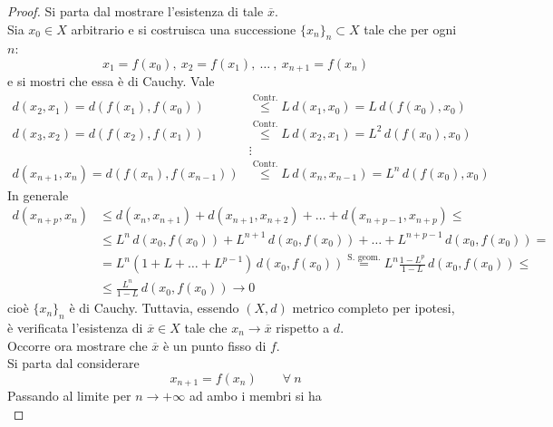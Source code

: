 \begin{proof}
    Si parta dal mostrare l'esistenza di tale $\overline{x}$.\\
    Sia $x_0 \in X$ arbitrario e si costruisca una successione $\{x_n\}_n \subset X$ tale che per ogni $n$:
    \begin{equation*}
            x_1=f(x_0),\ x_2=f(x_1),\ \dots\ ,\ x_{n+1}=f(x_n)
    \end{equation*}
    e si mostri che essa è di Cauchy. Vale
    \begin{equation*}
    \begin{aligned}
        d(x_2, x_1)=d(f(x_1), f(x_0)) &\overset{\text{Contr.}}{\leq} L\, d(x_1, x_0) = L\, d(f(x_0), x_0)\\
        d(x_3, x_2)=d(f(x_2), f(x_1)) &\overset{\text{Contr.}}{\leq} L\, d(x_2, x_1) = L^2\,d(f(x_0), x_0)\\
        &\vdots\\
        d(x_{n+1}, x_n)= d(f(x_n), f(x_{n-1}))&\overset{\text{Contr.}}{\leq} L\, d(x_n, x_{n-1}) = L^n\,d(f(x_0), x_0)
    \end{aligned}
    \end{equation*}
    In generale
    \begin{equation*}
    \begin{aligned}
        d(x_{n+p}, x_n) &\leq d(x_n, x_{n+1})+ d(x_{n+1}, x_{n+2})+ \dots+ d(x_{n+p-1}, x_{n+p}) \leq\\
        &\leq L^n\,d(x_0, f(x_0))+ L^{n+1}\, d(x_0, f(x_0))+ \dots+ L^{n+p-1}\, d(x_0, f(x_0))=\\
        &=L^n(1+L+\dots+L^{p-1})\,d(x_0, f(x_0)) \overset{\text{S. geom.}}{=} L^n \frac{1-L^p}{1-L}\, d(x_0, f(x_0)) \leq\\
        &\leq \frac{L^n}{1-L}\, d(x_0, f(x_0)) \to 0
    \end{aligned}
    \end{equation*}
    cioè $\{x_n\}_n$ è di Cauchy. Tuttavia, essendo $(X, d)$ metrico completo per ipotesi, è verificata l'esistenza di $\overline{x} \in X$ tale che $x_n \to \overline{x}$ rispetto a $d$.\\
    Occorre ora mostrare che $\overline{x}$ è un punto fisso di $f$.\\
    Si parta dal considerare 
    \begin{equation*}
        x_{n+1}=f(x_n) \qquad \forall\ n
    \end{equation*}
    Passando al limite per $n \to +\infty$ ad ambo i membri si ha
    \begin{equation*}

\end{equation*}
\end{proof}
